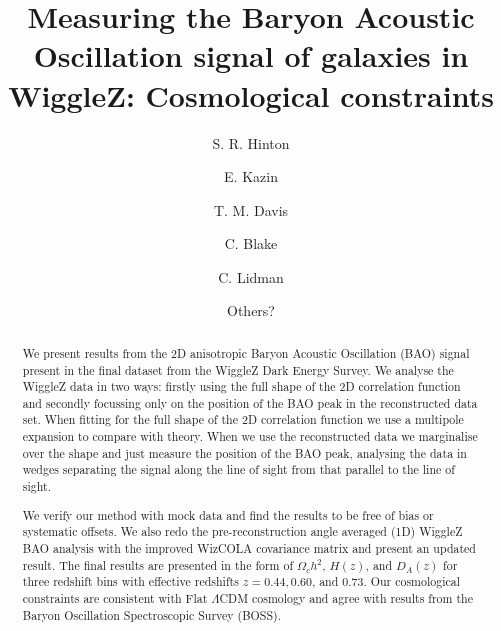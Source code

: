 \documentclass[iop,twocolappendix]{emulateapj}
\newcommand{\kmsmpc}{km\,s$^{-1}$\,Mpc$^{-1}$}
\begin{document}
\title{Measuring the Baryon Acoustic Oscillation signal of galaxies in WiggleZ: Cosmological constraints} %

\author{S. R. Hinton}

\author{E. Kazin}

\author{T. M. Davis}

\author{C. Blake}
 
\author{C. Lidman}

\author{Others?}


\begin{abstract}
We present results from the 2D anisotropic Baryon Acoustic Oscillation (BAO) signal present in the final dataset from the WiggleZ Dark Energy Survey.  We analyse the WiggleZ data in two ways: firstly using the full shape of the 2D correlation function and secondly focussing only on the position of the BAO peak in the reconstructed data set. When fitting for the full shape of the 2D correlation function we use a multipole expansion to compare with theory.  When we use the reconstructed data we marginalise over the shape and just measure the position of the BAO peak, analysing the data in wedges separating the signal along the line of sight from that parallel to the line of sight. 

We verify our method with mock data and find the results to be free of bias or systematic offsets.  We also redo the pre-reconstruction angle averaged (1D) WiggleZ BAO analysis with the improved WizCOLA covariance matrix and present an updated result.   The final results are presented in the form of $\Omega_c h^2$, $H(z)$, and $D_A(z)$ for three redshift bins with effective redshifts $z = 0.44, 0.60$, and $0.73$.  
Our cosmological constraints are consistent with Flat $\Lambda$CDM cosmology and agree with results from the Baryon Oscillation Spectroscopic Survey (BOSS).
\end{abstract}
\end{document}
